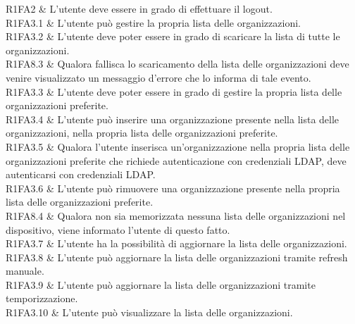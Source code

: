 R1FA2 & L'utente deve essere in grado di effettuare il logout.\\

R1FA3.1 & L'utente può gestire la propria lista delle organizzazioni.\\

R1FA3.2 & L'utente deve poter essere in grado di scaricare la lista di tutte le organizzazioni. \\

R1FA8.3 & Qualora fallisca lo scaricamento della lista delle organizzazioni deve venire visualizzato un messaggio d'errore che lo informa di tale evento.\\

R1FA3.3 & L’utente deve poter essere in grado di gestire la propria lista delle organizzazioni preferite.\\

R1FA3.4 & L’utente può inserire una organizzazione presente nella lista delle organizzazioni, nella propria lista delle organizzazioni preferite. \\

R1FA3.5 & Qualora l’utente inserisca un'organizzazione nella propria lista delle organizzazioni preferite che richiede autenticazione con credenziali LDAP, deve autenticarsi con credenziali LDAP.\\

R1FA3.6 & L’utente può rimuovere una organizzazione presente nella propria lista delle organizzazioni preferite. \\

R1FA8.4 & Qualora non sia memorizzata nessuna lista delle organizzazioni nel dispositivo, viene informato l’utente di questo fatto. \\

R1FA3.7 & L’utente ha la possibilità di aggiornare la lista delle organizzazioni. \\

R1FA3.8 & L’utente può aggiornare la lista delle organizzazioni tramite refresh manuale. \\

R1FA3.9 & L’utente può aggiornare la lista delle organizzazioni tramite temporizzazione.\\

R1FA3.10 & L’utente può visualizzare la lista delle organizzazioni.\\

